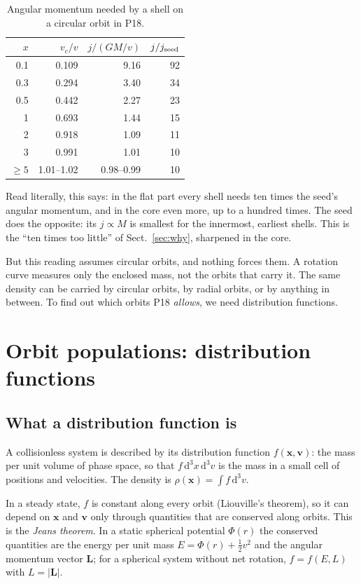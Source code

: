 \documentclass[11pt,a4paper]{article}
\newcommand{\dd}{\mathrm{d}}
\begin{document}
\begin{table}[h]
\centering\small
\caption{Angular momentum needed by a shell on a circular orbit in P18.}
\label{tab:j}
\begin{tabular}{rrrr}
\toprule
$x$ & $v_c/v$ & $j/(GM/v)$ & $j/j_{\rm seed}$\\
\midrule
0.1 & 0.109 & 9.16 & 92\\
0.3 & 0.294 & 3.40 & 34\\
0.5 & 0.442 & 2.27 & 23\\
1 & 0.693 & 1.44 & 15\\
2 & 0.918 & 1.09 & 11\\
3 & 0.991 & 1.01 & 10\\
$\ge5$ & 1.01--1.02 & 0.98--0.99 & 10\\
\bottomrule
\end{tabular}
\end{table}

Read literally, this says: in the flat part every shell needs ten times the seed's
angular momentum, and in the core even more, up to a hundred times. The seed does the
opposite: its $j\propto M$ is smallest for the innermost, earliest shells. This is the
``ten times too little'' of Sect.~\ref{sec:why}, sharpened in the core.

But this reading assumes circular orbits, and nothing forces them. A rotation curve
measures only the enclosed mass, not the orbits that carry it. The same density can
be carried by circular orbits, by radial orbits, or by anything in between. To find
out which orbits P18 \emph{allows}, we need distribution functions.

\section{Orbit populations: distribution functions}\label{sec:df}

\subsection{What a distribution function is}
A collisionless system is described by its distribution function $f(\mathbf
x,\mathbf v)$: the mass per unit volume of phase space, so that $f\,\dd^3x\,
\dd^3v$ is the mass in a small cell of positions and velocities. The density is
$\rho(\mathbf x)=\int f\,\dd^3v$.

In a steady state, $f$ is constant along every orbit (Liouville's theorem), so it
can depend on $\mathbf x$ and $\mathbf v$ only through quantities that are conserved
along orbits. This is the \emph{Jeans theorem}. In a static spherical potential
$\Phi(r)$ the conserved quantities are the energy per unit mass
$E=\Phi(r)+\tfrac12v^2$ and the angular momentum vector $\mathbf L$; for a
spherical system without net rotation, $f=f(E,L)$ with $L=|\mathbf L|$.
\end{document}
